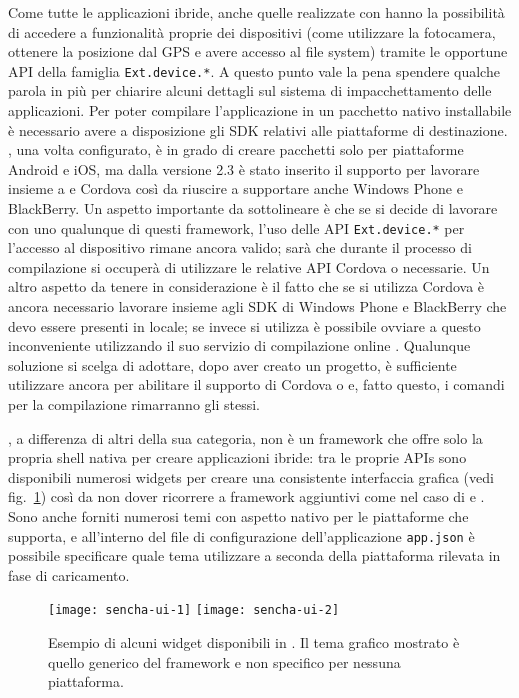 			Come tutte le applicazioni ibride, anche quelle realizzate con
			\senchat{} hanno la possibilità di accedere a funzionalità proprie
			dei dispositivi (come utilizzare la fotocamera, ottenere la posizione
			dal GPS e avere accesso al file sys\-tem) tramite le opportune API
			della famiglia \verb|Ext.device.*|. A questo punto vale la pena
			spendere qualche parola in più per chiarire alcuni dettagli sul
			sistema di impacchettamento delle applicazioni. Per poter compilare
			l'applicazione in un pacchetto nativo installabile è necessario
			avere a disposizione gli SDK relativi alle piattaforme di destinazione.
			\senchacmd{}, una volta configurato, è in grado di creare pacchetti
			solo per piattaforme Android e iOS, ma dalla versione 2.3 è stato
			inserito il supporto per lavorare insieme a \pg{} e Cordova così da
			riuscire a supportare anche Windows Phone e BlackBerry. Un aspetto
			importante da sottolineare è che se si decide di lavorare con uno
			qualunque di questi framework, l'uso delle API \verb|Ext.device.*| per
			l'accesso al dispositivo rimane ancora valido; sarà \senchacmd{} che
			durante il processo di compilazione si occuperà di utilizzare le
			relative API Cordova o \pg{} necessarie. Un altro aspetto da
			tenere in considerazione è il fatto che se si utilizza Cordova è
			ancora necessario lavorare insieme agli SDK di Windows Phone e BlackBerry
			che devo essere presenti in locale; se invece si utilizza \pg{} è
			possibile ovviare a questo inconveniente utilizzando il suo servizio
			di compilazione online \pgb{}. Qualunque soluzione si scelga di
			adottare, dopo aver creato un progetto, è sufficiente utilizzare
			ancora \senchacmd{} per abilitare il supporto di Cordova o \pg{} e,
			fatto questo, i comandi per la compilazione rimarranno gli stessi.
			
			\senchat{}, a differenza di altri della sua categoria, non è un
			framework che offre	solo la propria shell nativa per creare
			applicazioni ibride: tra le	proprie APIs sono disponibili numerosi
			widgets per creare una consistente interfaccia grafica
			(vedi fig.~\ref{fig:senchaui}) così da non dover ricorrere a
			framework aggiuntivi come nel caso di \pg{} e \rhom{}. Sono anche
			forniti numerosi temi con aspetto nativo per le piattaforme che
			supporta, e all'interno del file di configurazione dell'applicazione
			\verb|app.json| è possibile specificare quale tema utilizzare a
			seconda della piattaforma rilevata in fase di caricamento.
			\begin{figure}[h]
				\centering
				\texttt{[image: sencha-ui-1]}
				\texttt{[image: sencha-ui-2]}
				\label{fig:senchaui}
				\caption{
					Esempio di alcuni widget disponibili in \senchat{}.
					Il tema grafico mostrato è quello generico del framework e
					non specifico per nessuna piattaforma.
				}
			\end{figure}
			
